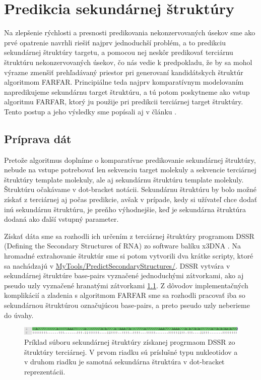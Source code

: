 \chapter{Predikcia sekundárnej štruktúry}

Na zlepšenie rýchlosti a presnosti predikovania nekonzervovaných úsekov sme ako prvé opatrenie navrhli riešiť najprv jednoduchší problém, a to predikciu sekundárnej štruktúry targetu, a pomocou nej neskôr predikovať terciárnu štruktúru nekonzervovaných úsekov, čo nás vedie k predpokladu, že by sa mohol výrazne zmenšiť prehľadávaný priestor pri generovaní kandidátskych štruktúr algoritmom FARFAR. Principiálne teda najprv komparatívnym modelovaním napredikujeme sekundárnu target štruktúru, a tú potom poskytneme ako vstup algoritmu FARFAR, ktorý ju použije pri predikcii terciárnej target štruktúry. Tento postup a jeho výsledky sme popísali aj v článku \cite{8218009}.

\section{Príprava dát}
Pretože algoritmus doplníme o komparatívne predikovanie sekundárnej štruktúry, nebude na vstupe potrebovať len sekvenciu target molekuly a sekvencie terciárnej štruktúry template molekuly, ale aj sekundárnu štruktúru template molekuly. Štruktúru očakávame v dot-bracket notácii. Sekundárnu štruktúru by bolo možné získať z terciárnej aj počas predikcie, avšak v prípade, kedy si užívateľ chce dodať inú sekundárnu štruktúru, je preňho výhodnejšie, keď je sekundárna štruktúra dodaná ako ďalší vstupný parameter.


\indent Získať dáta sme sa rozhodli ich určením z terciárnej štruktúry programom DSSR (Defining the Secondary Structures of RNA) zo software balíku x3DNA \cite{x3dna}. Na hromadné extrahovanie štruktúr sme si potom vytvorili dva krátke scripty, ktoré sa nachádzajú v \url{MyTools/PredictSecondaryStructures/}. DSSR vytvára v sekundárnej štruktúre base-pairs vyznačené jednoduchými zátvorkami, ako aj pseudo uzly vyznačené hranatými zátvorkami \ref{obr5.0}. Z dôvodov implementačných komplikácií a zladenia s algoritmom FARFAR sme sa rozhodli pracovať iba so sekundárnou štruktúrou označujúcou base-pairs, a preto pseudo uzly neberieme do úvahy.
\begin{figure}%
\includegraphics[width=\textwidth]{../img/dssr}
\caption{Príklad súboru sekundárnej štruktúry získanej progrmaom DSSR zo štruktúry terciárnej. V prvom riadku sú príslušné typu nukleotidov a v druhom riadku je samotná sekundárna štruktúra v  dot-bracket reprezentácii.}
\label{obr5.0}
\end{figure}


